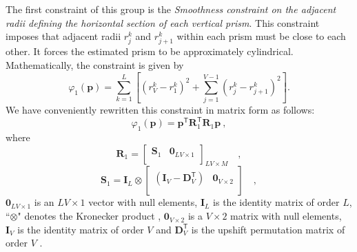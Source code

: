 The first constraint of this group is the \textit{Smoothness constraint on the adjacent radii defining the horizontal 
section of each vertical prism}. This constraint imposes that adjacent radii $r_{j}^{k}$ and $r_{j+1}^{k}$ within each 
prism must be close to each other. It forces the estimated prism to be approximately cylindrical. Mathematically, the constraint is given by
\begin{equation}\label{eq:phi1_sum}
\varphi_{1}(\mathbf{p}) = \sum\limits^{L}_{k=1}\left[\left(r^{k}_{V}-r^{k}_{1}\right)^2 + \sum\limits^{V-1}_{j=1}\left(r^{k}_{j}-r^{k}_{j+1}\right)^2\right] .
\end{equation}
We have conveniently rewritten this constraint in matrix form as follows:
\begin{equation}
\varphi_{1}(\mathbf{p}) = \mathbf{p}^{\mathsf{T}} \mathbf{R}^{\mathsf{T}}_{1}\mathbf{R}_{1} \mathbf{p} \: ,
\label{eq:phi1}
\end{equation}
where 
\begin{equation}
\mathbf{R}_{1} = \begin{bmatrix} 
\mathbf{S}_{1} & \mathbf{0}_{LV \times 1} \\
\end{bmatrix}_{LV \times M} \quad ,
\label{eq:R1-matrix}
\end{equation}
\begin{equation}
\mathbf{S}_{1} = 
\mathbf{I}_{L} \otimes 
\begin{bmatrix}
\left( \mathbf{I}_{V} - \mathbf{D}_{V}^\mathsf{T} \right) & \mathbf{0}_{V \times 2} \\
\end{bmatrix} \quad ,
\label{eq:S1-matrix}
\end{equation}
$\mathbf{0}_{LV \times 1}$ is an $LV \times 1$ vector with null elements, 
$\mathbf{I}_{L}$ is the identity matrix of order $L$, ``$\otimes$" denotes the Kronecker product 
\citep[][ p. 243]{horn_johnson1991}, $\mathbf{0}_{V \times 2}$ is a $V \times 2$ matrix with null elements, 
$\mathbf{I}_{V}$ is the identity matrix of order $V$ and $\mathbf{D}_{V}^\mathsf{T}$ is the upshift permutation 
matrix of order $V$ \citep[][ p. 20]{golub-vanloan2013}.

